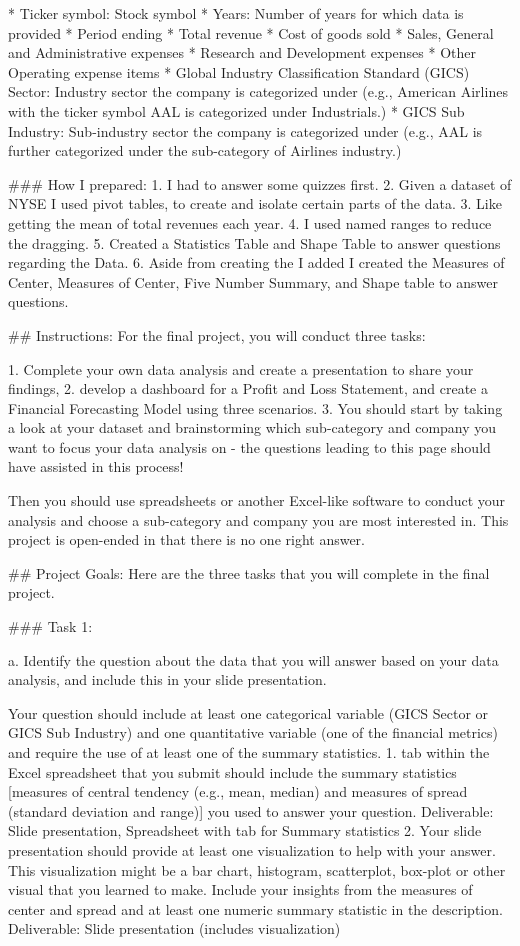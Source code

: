 * Ticker symbol: Stock symbol
* Years: Number of years for which data is provided
* Period ending
* Total revenue
* Cost of goods sold
* Sales, General and Administrative expenses
* Research and Development expenses
* Other Operating expense items
* Global Industry Classification Standard (GICS) Sector: Industry sector the company is categorized under (e.g., American Airlines with the ticker symbol AAL is categorized under Industrials.)
* GICS Sub Industry: Sub-industry sector the company is categorized under (e.g., AAL is further categorized under the sub-category of Airlines industry.)

### How I prepared:
1. I had to answer some quizzes first.
2. Given a dataset of NYSE I used pivot tables, to create and isolate certain parts of the data.
3. Like getting the mean of total revenues each year.
4. I used named ranges to reduce the dragging.
5. Created a Statistics Table and Shape Table to answer questions regarding the Data.
6. Aside from creating the I added I created the Measures of Center, Measures of Center, Five Number Summary, and Shape table to answer questions.

## Instructions:
For the final project, you will conduct three tasks:

1. Complete your own data analysis and create a presentation to share your findings,
2. develop a dashboard for a Profit and Loss Statement, and create a Financial Forecasting Model using three scenarios.
3. You should start by taking a look at your dataset and brainstorming which sub-category and company you want to focus your data analysis on - the questions leading to this page should have assisted in this process!

Then you should use spreadsheets or another Excel-like software to conduct your analysis and choose a sub-category and company you are most interested in. This project is open-ended in that there is no one right answer.

## Project Goals:
Here are the three tasks that you will complete in the final project.

### Task 1:

a. Identify the question about the data that you will answer based on your data analysis, and include this in your slide presentation.

Your question should include at least one categorical variable (GICS Sector or GICS Sub Industry) and one quantitative variable (one of the financial metrics) and require the use of at least one of the summary statistics.
1. tab within the Excel spreadsheet that you submit should include the summary statistics [measures of central tendency (e.g., mean, median) and measures of spread (standard deviation and range)] you used to answer your question. Deliverable: Slide presentation, Spreadsheet with tab for Summary statistics
2. Your slide presentation should provide at least one visualization to help with your answer.
This visualization might be a bar chart, histogram, scatterplot, box-plot or other visual that you learned to make. Include your insights from the measures of center and spread and at least one numeric summary statistic in the description.
Deliverable: Slide presentation (includes visualization)

